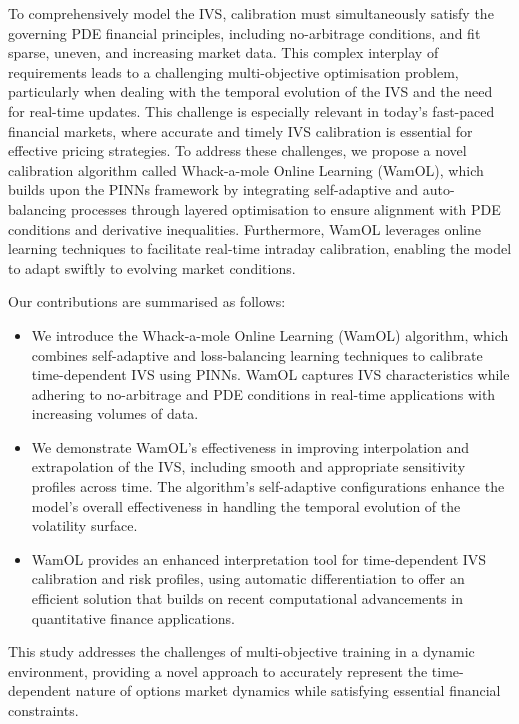 \documentclass[sigconf, authorversion=true, nonacm=true]{acmart}
\begin{document}
To comprehensively model the IVS, calibration must simultaneously satisfy the governing PDE financial principles, including no-arbitrage conditions, and fit sparse, uneven, and increasing market data. This complex interplay of requirements leads to a challenging multi-objective optimisation problem, particularly when dealing with the temporal evolution of the IVS and the need for real-time updates. This challenge is especially relevant in today's fast-paced financial markets, where accurate and timely IVS calibration is essential for effective pricing strategies. To address these challenges, we propose a novel calibration algorithm called Whack-a-mole Online Learning (WamOL), which builds upon the PINNs framework by integrating self-adaptive and auto-balancing processes through layered optimisation to ensure alignment with PDE conditions and derivative inequalities. Furthermore, WamOL leverages online learning techniques to facilitate real-time intraday calibration, enabling the model to adapt swiftly to evolving market conditions.

Our contributions are summarised as follows:
\begin{itemize}
    \item We introduce the Whack-a-mole Online Learning (WamOL) algorithm, which combines self-adaptive and loss-balancing learning techniques to calibrate time-dependent IVS using PINNs. WamOL captures IVS characteristics while adhering to no-arbitrage and PDE conditions in real-time applications with increasing volumes of data.
    \item We demonstrate WamOL's effectiveness in improving interpolation and extrapolation of the IVS, including smooth and appropriate sensitivity profiles across time. The algorithm's self-adaptive configurations enhance the model's overall effectiveness in handling the temporal evolution of the volatility surface.
    \item WamOL provides an enhanced interpretation tool for time-dependent IVS calibration and risk profiles, using automatic differentiation to offer an efficient solution that builds on recent computational advancements in quantitative finance applications.
\end{itemize}
This study addresses the challenges of multi-objective training in a dynamic environment, providing a novel approach to accurately represent the time-dependent nature of options market dynamics while satisfying essential financial constraints.
\end{document}
